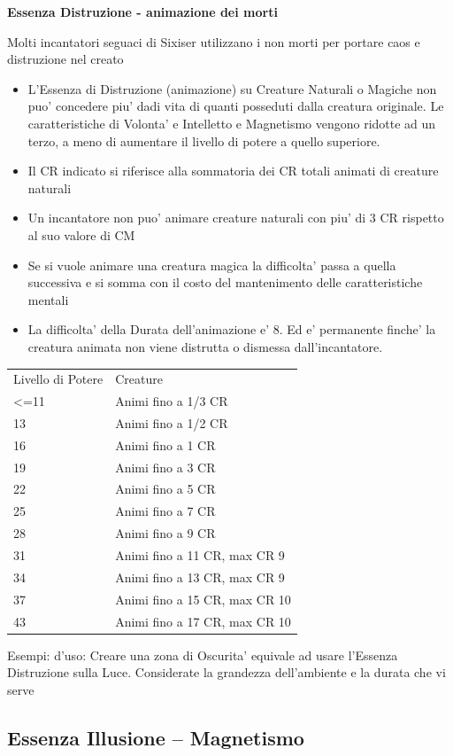 \documentclass[a4paper,11pt,twoside,openany]{dndbook}
\begin{document}
\textbf{Essenza Distruzione - animazione dei morti}

Molti incantatori seguaci di Sixiser utilizzano i non morti per portare caos e distruzione nel creato

\begin{itemize}
\item 
L'Essenza di Distruzione (animazione) su Creature Naturali o Magiche non puo' concedere piu' dadi vita di quanti posseduti dalla creatura originale. Le caratteristiche di Volonta' e Intelletto e Magnetismo vengono ridotte ad un terzo, a meno di aumentare il livello di potere a quello superiore. 
\item 
Il CR indicato si riferisce alla sommatoria dei CR totali animati di creature naturali 
\item 
Un incantatore non puo' animare creature naturali con piu' di 3 CR rispetto al suo valore di CM 
\item 
Se si vuole animare una creatura magica la difficolta' passa a quella successiva e si somma con il costo del mantenimento delle caratteristiche mentali 
\item 
La difficolta' della Durata dell'animazione e' 8. Ed e' permanente
finche' la creatura animata non viene distrutta o dismessa dall'incantatore. 
\end{itemize}

\bigskip

\begin{tabular}[c]{@{}ll@{}}
\toprule 
Livello di Potere & Creature\tabularnewline
\textless=11 & Animi fino a 1/3 CR\tabularnewline
13 & Animi fino a 1/2 CR\tabularnewline
16 & Animi fino a 1 CR\tabularnewline
19 & Animi fino a 3 CR\tabularnewline
22 & Animi fino a 5 CR\tabularnewline
25 & Animi fino a 7 CR\tabularnewline
28 & Animi fino a 9 CR\tabularnewline
31 & Animi fino a 11 CR, max CR 9\tabularnewline
34 & Animi fino a 13 CR, max CR 9\tabularnewline
37 & Animi fino a 15 CR, max CR 10\tabularnewline
43 & Animi fino a 17 CR, max CR 10\tabularnewline
\bottomrule
\end{tabular}

\bigskip

Esempi: d'uso:
Creare una zona di Oscurita' equivale ad usare l'Essenza Distruzione sulla Luce. Considerate la grandezza dell'ambiente e la durata che vi serve

\pagebreak

\subsection{Essenza Illusione -- Magnetismo}
\end{document}
